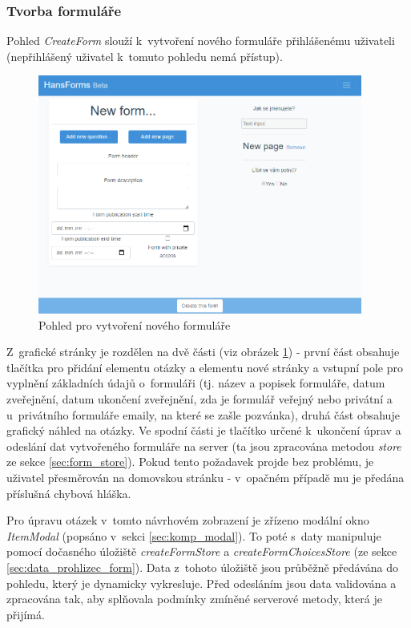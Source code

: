 		\subsubsection{Tvorba formuláře}\label{sec:pohled_tvorba_formulare} %
		Pohled \textit{CreateForm} slouží k~vytvoření nového formuláře přihlášenému uživateli (nepřihlášený uživatel k~tomuto pohledu nemá přístup). 
		
		\begin{figure}[h]
			\centering
			\includegraphics[width=0.95\textwidth]{img/pohledy/createform.png}
			\caption{Pohled pro vytvoření nového formuláře}
			\label{fig:pohled_createform}
		\end{figure}
		
		Z~grafické stránky je rozdělen na dvě části (viz obrázek \ref{fig:pohled_createform}) - první část obsahuje tlačítka pro přidání elementu otázky a elementu nové stránky a vstupní pole pro vyplnění základních údajů o~formuláři (tj. název a popisek formuláře, datum zveřejnění, datum ukončení zveřejnění, zda je formulář veřejný nebo privátní a u~privátního formuláře emaily, na které se zašle pozvánka), druhá část obsahuje grafický náhled na otázky. Ve spodní části je tlačítko určené k~ukončení úprav a odeslání dat vytvořeného formuláře na server (ta jsou zpracována metodou \textit{store} ze sekce \ref{sec:form_store}). Pokud tento požadavek projde bez problému, je uživatel přesměrován na domovskou stránku - v~opačném případě mu je předána příslušná chybová hláška.
		
		Pro úpravu otázek v~tomto návrhovém zobrazení je zřízeno modální okno \textit{ItemModal} (popsáno v~sekci \ref{sec:komp_modal}). To poté s~daty manipuluje pomocí dočasného úložiště \textit{createFormStore} a \textit{createFormChoicesStore} (ze sekce \ref{sec:data_prohlizec_form}). Data z~tohoto úložiště jsou průběžně předávána do pohledu, který je dynamicky vykresluje. Před odesláním jsou data validována a zpracována tak, aby splňovala podmínky zmíněné serverové metody, která je přijímá.
		
